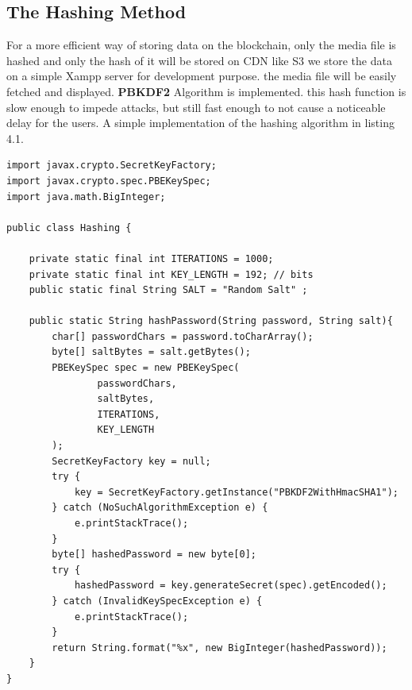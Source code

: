 \cleardoublepage

\subsection{The Hashing Method}
For a more efficient way of storing data on the blockchain, only the media file is hashed and only the hash of it will be stored on CDN like S3 we store the data on a simple Xampp server for development purpose. the media file will be easily fetched and displayed. 
\textbf{PBKDF2} Algorithm is implemented. this hash function is slow enough to impede attacks, but still fast enough to not cause a noticeable delay for the users. A simple implementation of the hashing algorithm in listing 4.1.

 \begin{lstlisting}[caption={PBKDF2 Simple Implementation},captionpos=b]
import javax.crypto.SecretKeyFactory;
import javax.crypto.spec.PBEKeySpec;
import java.math.BigInteger;

public class Hashing {

    private static final int ITERATIONS = 1000;
    private static final int KEY_LENGTH = 192; // bits
    public static final String SALT = "Random Salt" ;

    public static String hashPassword(String password, String salt){
        char[] passwordChars = password.toCharArray();
        byte[] saltBytes = salt.getBytes();
        PBEKeySpec spec = new PBEKeySpec(
                passwordChars,
                saltBytes,
                ITERATIONS,
                KEY_LENGTH
        );
        SecretKeyFactory key = null;
        try {
            key = SecretKeyFactory.getInstance("PBKDF2WithHmacSHA1");
        } catch (NoSuchAlgorithmException e) {
            e.printStackTrace();
        }
        byte[] hashedPassword = new byte[0];
        try {
            hashedPassword = key.generateSecret(spec).getEncoded();
        } catch (InvalidKeySpecException e) {
            e.printStackTrace();
        }
        return String.format("%x", new BigInteger(hashedPassword));
    }
}
\end{lstlisting}
\cleardoublepage


